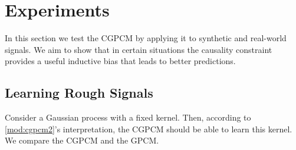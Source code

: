 \documentclass{article}
\begin{document}
\section{Experiments}
In this section we test the CGPCM by applying it to synthetic and real-world signals. We aim to show that in certain situations the causality constraint provides a useful inductive bias that leads to better predictions.


\subsection{Learning Rough Signals}
Consider a Gaussian process with a fixed kernel. Then, according to \cref{mod:cgpcm2}'s interpretation, the CGPCM should be able to learn this kernel. We compare the CGPCM and the GPCM.
\end{document}
